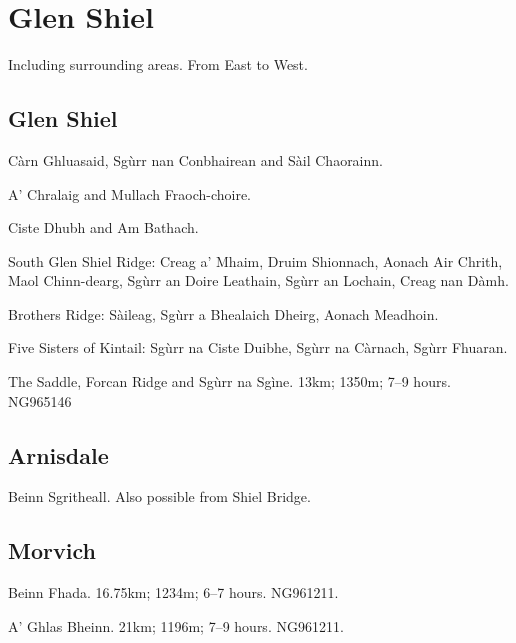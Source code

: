 \section{Glen Shiel}

Including surrounding areas.  From East to West.

\subsection{Glen Shiel}

\begin{munros}
\item
Càrn Ghluasaid, Sgùrr nan Conbhairean and Sàil Chaorainn.

\item
A' Chralaig and Mullach Fraoch-choire.

\item
Ciste Dhubh and Am Bathach.

\item
South Glen Shiel Ridge: Creag a' Mhaim, Druim Shionnach, Aonach Air Chrith,
Maol Chinn-dearg, Sgùrr an Doire Leathain, Sgùrr an Lochain, Creag nan Dàmh.

\item
Brothers Ridge: Sàileag, Sgùrr a Bhealaich Dheirg, Aonach Meadhoin.

\item
Five Sisters of Kintail: Sgùrr na Ciste Duibhe, Sgùrr na Càrnach, Sgùrr
Fhuaran.

\item \target
The Saddle, Forcan Ridge and Sgùrr na Sgìne.  13km; 1350m; 7--9 hours.  NG965146
\end{munros}


\subsection{Arnisdale}

\begin{munros}
\item
Beinn Sgritheall.  Also possible from Shiel Bridge.
\end{munros}


\subsection{Morvich}

\begin{munros}
\item
Beinn Fhada.  16.75km; 1234m; 6--7 hours.  NG961211.

\item
A' Ghlas Bheinn.  21km; 1196m; 7--9 hours.  NG961211.
\end{munros}
